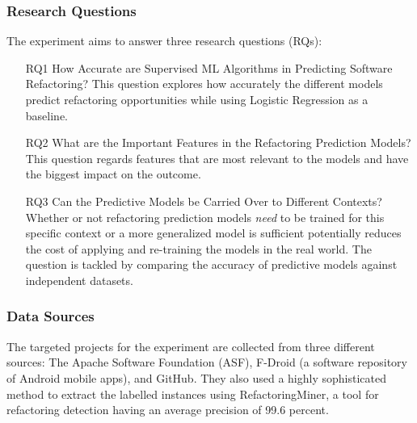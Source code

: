 \subsubsection{Research Questions}
The experiment aims to answer three research questions (RQs): 
\begin{itemize}
    \item[RQ1] How Accurate are Supervised ML Algorithms in Predicting Software Refactoring? This question explores how accurately the different models predict refactoring opportunities while using Logistic Regression as a baseline.
    \item[RQ2] What are the Important Features in the Refactoring Prediction Models? This question regards features that are most relevant to the models and have the biggest impact on the outcome.
    \item[RQ3] Can the Predictive Models be Carried Over to Different Contexts? Whether or not refactoring prediction models \textit{need} to be trained for this specific context or a more generalized model is sufficient potentially reduces the cost of applying and re-training the models in the real world. The question is tackled by comparing the accuracy of predictive models against independent datasets.
\end{itemize}
\subsubsection{Data Sources}
The targeted projects for the experiment are collected from three different sources: The Apache Software Foundation (ASF), F-Droid (a software repository of Android mobile apps), and GitHub. They also used a highly sophisticated method to extract the labelled instances using RefactoringMiner\cite{tsantalis2018accurate}, a tool for refactoring detection having an average precision of 99.6 percent\cite{tsantalis2022refactoringminer}.
